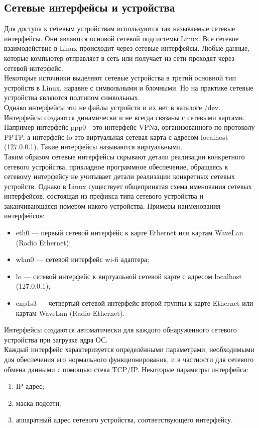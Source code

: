 \documentclass[14pt, a4paper]{extarticle}
\begin{document}
\subsection{Сетевые интерфейсы и устройства}
Для доступа к сетевым устройствам используются так называемые сетевые интерфейсы. Они являются основой сетевой подсистемы Linux. Все сетевое взаимодействие в Linux происходит через сетевые интерфейсы. Любые данные, которые компьютер отправляет в сеть или получает из сети проходят через сетевой интерфейс. \\
\indent Некоторые источники \cite{ldd-trans}\cite{ldd-orig} выделяют сетевые устройства в третий основной тип устройств в Linux, наравне с символьными и блочными. Но на практике сетевые устройства являются подтипом символьных. \\
\indent Однако интерфейсы это не файлы устройств и их нет в каталоге /dev. Интерфейсы создаются динамически и не всегда связаны с сетевыми картами. Например интерфейс ppp0 - это интерфейс VPNа, организованного по протоколу PPTP, а интерфейс lo это виртуальная сетевая карта с адресом localhost (127.0.0.1). Такие интерфейсы называются виртуальными. \\
\indent Таким образом сетевые интерфейсы скрывают детали реализации конкретного сетевого устройства, прикладное программное обеспечение, обращаясь к сетевому интерфейсу не учитывает детали реализации конкретных сетевых устройств. Однако в Linux существует общепринятая схема именования сетевых интерфейсов, состоящая из префикса типа сетевого устройства и заканчивающаяся номером иакого устройства. Примеры наименования интерфейсов:
\begin{itemize}
	\item eth0 --- первый сетевой интерфейс к карте Ethernet или картам WaveLan (Radio Ethernet);
	\item wlan0 --- сетевой интерфейс wi-fi адаптера;
	\item  lo --- сетевой интерфейс к виртуальной сетевой карте с адресом localhost (127.0.0.1);
	\item  enp1s3 --- четвертый сетевой  интерфейс второй группы к карте Ethernet или картам WaveLan (Radio Ethernet).
\end{itemize}
Интерфейсы создаются автоматически для каждого обнаруженного сетевого устройства при загрузке ядра ОС. \\
\indent Каждый интерфейс характеризуется определёнными параметрами, необходимыми для обеспечения его нормального функционирования, и в частности для сетевого обмена данными с помощью стека TCP/IP. Некоторые параметры интерфейса:
\begin{enumerate}
	\item IP-адрес;
	\item маска подсети;
	\item аппаратный адрес сетевого устройства, соответствующего интерфейсу.
\end{enumerate}
\end{document}

